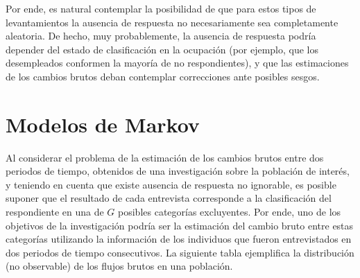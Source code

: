 \documentclass[
  12pt,
]{book}
\begin{document}
Por ende, es natural contemplar la posibilidad de que para estos tipos de levantamientos la ausencia de respuesta no necesariamente sea completamente aleatoria. De hecho, muy probablemente, la ausencia de respuesta podría depender del estado de clasificación en la ocupación (por ejemplo, que los desempleados conformen la mayoría de no respondientes), y que las estimaciones de los cambios brutos deban contemplar correcciones ante posibles sesgos.

\hypertarget{modelos-de-markov}{%
\section{Modelos de Markov}\label{modelos-de-markov}}

Al considerar el problema de la estimación de los cambios brutos entre dos periodos de tiempo, obtenidos de una investigación sobre la población de interés, y teniendo en cuenta que existe ausencia de respuesta no ignorable, es posible suponer que el resultado de cada entrevista corresponde a la clasificación del respondiente en una de \(G\) posibles categorías excluyentes. Por ende, uno de los objetivos de la investigación podría ser la estimación del cambio bruto entre estas categorías utilizando la información de los individuos que fueron entrevistados en dos periodos de tiempo consecutivos. La siguiente tabla ejemplifica la distribución (no observable) de los flujos brutos en una población.
\end{document}
